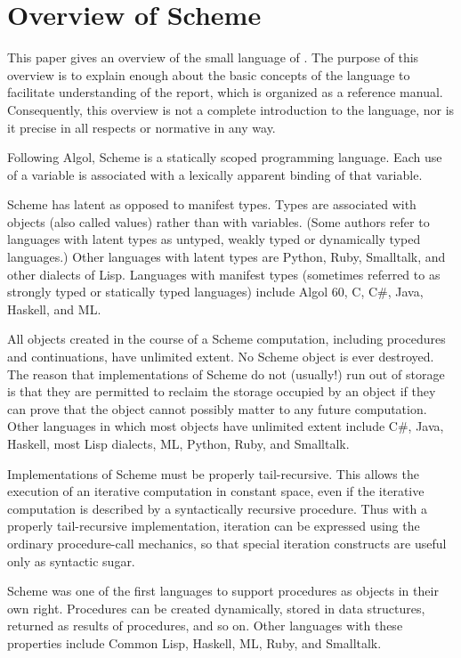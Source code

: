 \chapter*{Overview of Scheme}

This paper gives an overview of 
the small language of \rsevenrs.
The purpose of this overview is to explain
enough about the basic concepts of the language to facilitate
understanding of the \rsevenrs{} report, which is
organized as a reference manual.  Consequently, this overview is
not a complete introduction to the language, nor is it precise
in all respects or normative in any way.

\vest Following Algol, Scheme is a statically scoped programming
language.  Each use of a variable is associated with a lexically
apparent binding of that variable.

\vest Scheme has latent as opposed to manifest types.  Types
are associated with objects (also called values) rather than
with variables.  (Some authors refer to languages with latent types as
untyped, weakly typed or dynamically typed languages.)  Other languages with
latent types are Python, Ruby, Smalltalk, and other dialects of Lisp.  Languages
with manifest types (sometimes referred to as strongly typed or
statically typed languages) include Algol 60, C, C\#, Java, Haskell, and ML.

\vest All objects created in the course of a Scheme computation, including
procedures and continuations, have unlimited extent.
No Scheme object is ever destroyed.  The reason that
implementations of Scheme do not (usually!) run out of storage is that
they are permitted to reclaim the storage occupied by an object if
they can prove that the object cannot possibly matter to any future
computation.  Other languages in which most objects have unlimited
extent include C\#, Java, Haskell, most Lisp dialects, ML, Python,
Ruby, and Smalltalk.

Implementations of Scheme must be properly tail-recursive.
This allows the execution of an iterative computation in constant space,
even if the iterative computation is described by a syntactically
recursive procedure.  Thus with a properly tail-recursive implementation,
iteration can be expressed using the ordinary procedure-call
mechanics, so that special iteration constructs are useful only as
syntactic sugar.

\vest Scheme was one of the first languages to support procedures as
objects in their own right.  Procedures can be created dynamically,
stored in data structures, returned as results of procedures, and so
on.  Other languages with these properties include Common Lisp,
Haskell, ML, Ruby, and Smalltalk.


